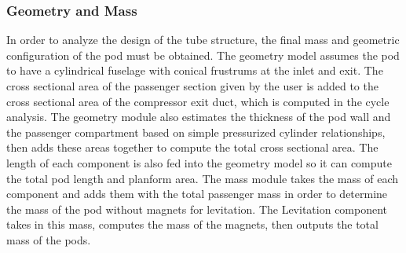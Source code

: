 \subsubsection{Geometry and Mass}
	In order to analyze the design of the tube structure, the final mass and geometric configuration of the pod must be obtained. The geometry model assumes the pod to have a cylindrical fuselage with conical frustrums at the inlet and exit. The cross sectional area of the passenger section  given by the user is added to the cross sectional area of the compressor exit duct, which is computed in the cycle analysis. The geometry module also estimates the thickness of the pod wall and the passenger compartment based on simple pressurized cylinder relationships, then adds these areas together to compute the total cross sectional area. The length of each component is also fed into the geometry model so it can compute the total pod length and planform area. The mass module takes the mass of each component and adds them with the total passenger mass in order to determine the mass of the pod without magnets for levitation. The Levitation component takes in this mass, computes the mass of the magnets, then outputs the total mass of the pods.
